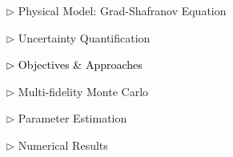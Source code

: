 \documentclass{beamer}
\begin{document}
\begin{frame}[c]
\large 	
\textcolor{mygray1}{
    \begin{itemize}[leftmargin=5pt] 
        \item[$\triangleright$]  Physical Model: Grad-Shafranov Equation
        \vspace{0.2cm}	
        \item[$\triangleright$] Uncertainty Quantification
        \vspace{0.2cm}
        \item[\textcolor{black}{$\triangleright$}] \textcolor{black}{\fontsize{25}{60}\selectfont Objectives \& Approaches}
        \vspace{0.2cm}
        \item[$\triangleright$] Multi-fidelity Monte Carlo
        \vspace{0.2cm}
        \item[$\triangleright$] Parameter Estimation
        \vspace{0.2cm}
        \item[$\triangleright$] Numerical Results
    \end{itemize}
}
\end{frame}
\end{document}
